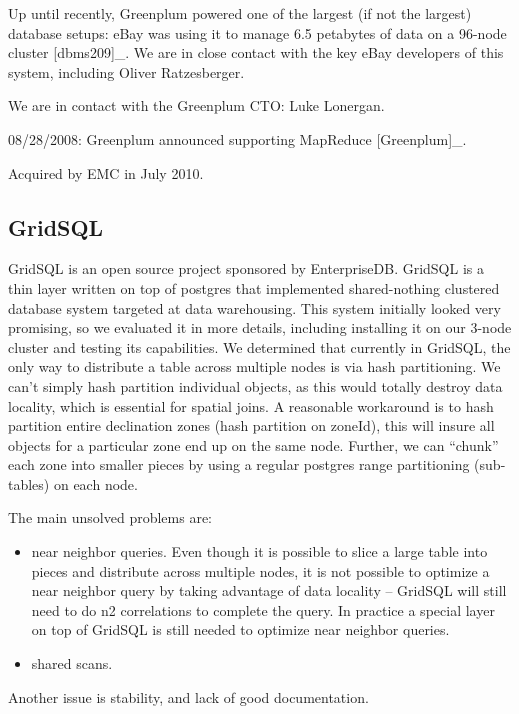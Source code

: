 \documentclass[DM,lsstdraft,toc]{lsstdoc}
\begin{document}
Up until recently, Greenplum powered one of the largest (if not the
largest) database setups: eBay was using it to manage 6.5 petabytes of
data on a 96-node cluster {[}dbms209{]}\_. We are in close contact with
the key eBay developers of this system, including Oliver Ratzesberger.

We are in contact with the Greenplum CTO: Luke Lonergan.

08/28/2008: Greenplum announced supporting MapReduce {[}Greenplum{]}\_.

Acquired by EMC in July 2010.

\subsection{GridSQL}\label{gridsql}

GridSQL is an open source project sponsored by EnterpriseDB. GridSQL is
a thin layer written on top of postgres that implemented shared-nothing
clustered database system targeted at data warehousing. This system
initially looked very promising, so we evaluated it in more details,
including installing it on our 3-node cluster and testing its
capabilities. We determined that currently in GridSQL, the only way to
distribute a table across multiple nodes is via hash partitioning. We
can't simply hash partition individual objects, as this would totally
destroy data locality, which is essential for spatial joins. A
reasonable workaround is to hash partition entire declination zones
(hash partition on zoneId), this will insure all objects for a
particular zone end up on the same node. Further, we can ``chunk'' each
zone into smaller pieces by using a regular postgres range partitioning
(sub-tables) on each node.

The main unsolved problems are:

\begin{itemize}
\item
  near neighbor queries. Even though it is possible to slice a large
  table into pieces and distribute across multiple nodes, it is not
  possible to optimize a near neighbor query by taking advantage of data
  locality -- GridSQL will still need to do n2 correlations to complete
  the query. In practice a special layer on top of GridSQL is still
  needed to optimize near neighbor queries.
\item
  shared scans.
\end{itemize}

Another issue is stability, and lack of good documentation.
\end{document}
